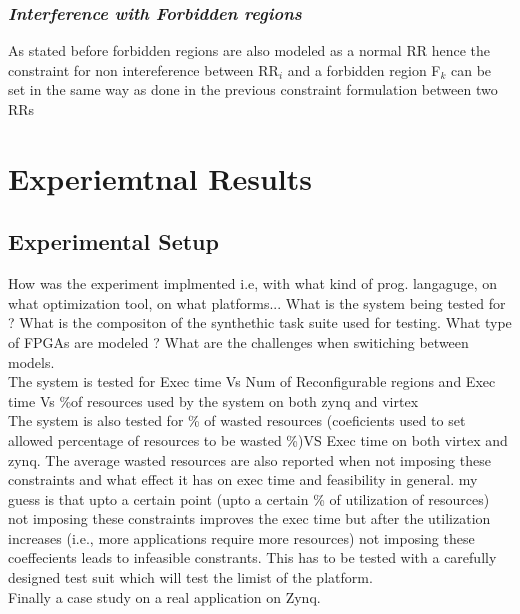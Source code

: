 \documentclass[conference]{IEEEtran}
\begin{document}
\subsubsection{\textit {Interference with Forbidden regions}}

As stated before forbidden regions are also modeled as a normal RR hence the constraint for non intereference between RR$_i$ and a forbidden region F$_k$ can be set in the same way as done in the previous constraint formulation between two RRs

\section{Experiemtnal Results}
\subsection{Experimental Setup}
How was the experiment implmented i.e, with what kind of prog. langaguge, on what optimization tool, on what platforms...
What is the system being tested for ? What is the compositon of the synthethic task suite used for testing. What type of FPGAs are modeled ?  What are the challenges when switiching between models.  \\


The system is tested for Exec time Vs Num of Reconfigurable regions and Exec time Vs \%of resources used by the system on both zynq and virtex\\

The system is also tested for \% of wasted resources (coeficients used to set allowed percentage of resources to be wasted \%)VS Exec time on both virtex and zynq. The average wasted resources are also reported when not imposing these constraints and what effect it has on exec time and feasibility in general. my guess is that upto a certain point (upto a certain \% of utilization of resources) not imposing these constraints improves the exec time but after the utilization increases (i.e., more applications require more resources) not imposing these coeffecients leads to infeasible constrants. This has to be tested with a carefully designed test suit which will test the limist of the platform. \\

Finally a case study on a real application on Zynq. 
\end{document}
